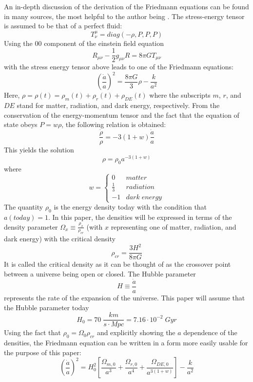 \documentclass[aps,reprint,prl]{revtex4-1}
\begin{document}
An in-depth discussion of the derivation of the Friedmann equations can be found in many sources, the most helpful to the author being \cite{carroll}.  The stress-energy tensor is assumed to be that of a perfect fluid:
$$T^{\mu}_{\nu}=diag(-\rho,P,P,P)$$
Using the $00$ component of the einstein field equation
$$R_{\mu\nu}-\frac{1}{2}g_{\mu\nu}R=8\pi GT_{\mu\nu} $$
with the stress energy tensor above leads to one of the Friedmann equations:
\begin{equation}
\left(\frac{\dot{a}}{a}\right)^2=\frac{8\pi G}{3}\rho-\frac{k}{a^2}
\end{equation}
Here, $\rho=\rho(t)=\rho_{m}(t)+\rho_{r}(t)+\rho_{DE}(t)$
where the subscripts $m$, $r$, and $DE$ stand for matter, radiation, and dark energy, respectively.  From the conservation of the energy-momentum tensor and the fact that the equation of state obeys $P=w\rho$, the following relation is obtained:
$$\frac{ \dot{\rho} }{\rho}=-3(1+w)\frac{ \dot{a} }{a}$$
This yields the solution
\begin{equation}
\rho=\rho_0a^{-3(1+w)}
\end{equation}
where
\[w = \left\{
  \begin{array}{lr}
    0 & matter\\
    \frac{1}{3} & radiation\\
    -1 & dark\;energy
  \end{array}
\right.
\]
The quantity $\rho_0$ is the energy density today with the condition that $a(today)=1$.  In this paper, the densities will be expressed in terms of the density parameter $\Omega_x \equiv \frac{ \rho_{x} }{\rho_{cr}}$ (with $x$ representing one of matter, radiation, and dark energy) with the critical density
$$\rho_{cr}=\frac{3H^2}{8\pi G}$$
It is called the critical density as it can be thought of as the crossover point between a universe being open or closed.  The Hubble parameter
\begin{equation} \label{eq:hubble}
H\equiv \frac{ \dot{a} }{a}
\end{equation}
represents the rate of the expansion of the universe.  This paper will assume that the Hubble parameter today
$$H_0=70\;\frac{km}{s\cdot Mpc}=7.16\cdot10^{-2}\;Gyr$$
Using the fact that $\rho_0=\Omega_0 \rho_{cr}$ and explicitly showing the $a$ dependence of the densities, the Friedmann equation can be written in a form more easily usable for the purpose of this paper:
\begin{equation} \label{eq:friedmann}
\left(\frac{\dot{a}}{a}\right)^2=H_0^2\left[ \frac{\Omega_{m,0}}{a^3}+\frac{\Omega_{r,0}}{a^4}+\frac{\Omega_{DE,0}}{a^{3(1+w)}} \right] -\frac{k}{a^2}
\end{equation}
\end{document}
